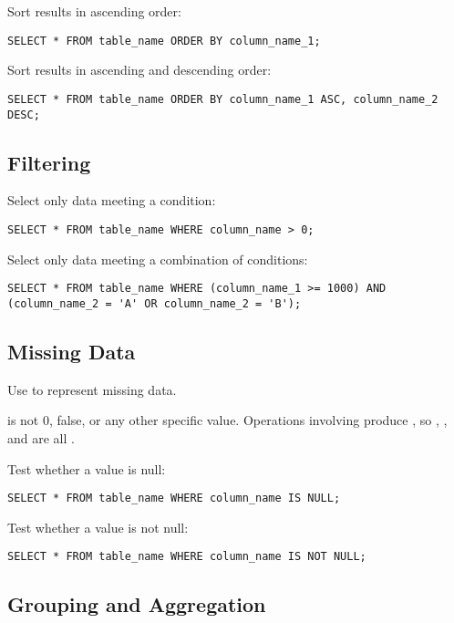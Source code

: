 Sort results in ascending order:

\begin{Verbatim}
SELECT * FROM table_name ORDER BY column_name_1;
\end{Verbatim}

Sort results in ascending and descending order:

\begin{Verbatim}
SELECT * FROM table_name ORDER BY column_name_1 ASC, column_name_2 DESC;
\end{Verbatim}

\subsection*{Filtering}

Select only data meeting a condition:

\begin{Verbatim}
SELECT * FROM table_name WHERE column_name > 0;
\end{Verbatim}

Select only data meeting a combination of conditions:

\begin{Verbatim}
SELECT * FROM table_name WHERE (column_name_1 >= 1000) AND (column_name_2 = 'A' OR column_name_2 = 'B');
\end{Verbatim}

\subsection*{Missing Data}

Use  to represent missing data.

 is not 0, false, or any other specific value. Operations
involving  produce , so ,
, and  are all .

Test whether a value is null:

\begin{Verbatim}
SELECT * FROM table_name WHERE column_name IS NULL;
\end{Verbatim}

Test whether a value is not null:

\begin{Verbatim}
SELECT * FROM table_name WHERE column_name IS NOT NULL;
\end{Verbatim}

\subsection*{Grouping and Aggregation}

